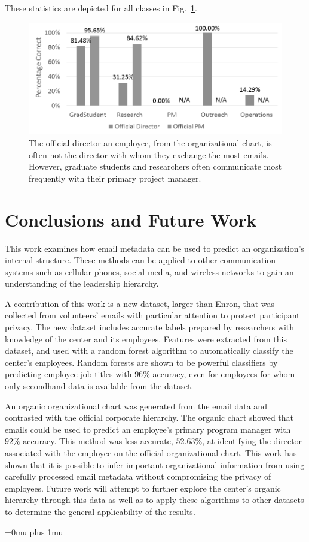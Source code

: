 \documentclass[10pt,twocolumn,conference]{IEEEtran}
\begin{document}
These statistics are depicted for all classes in Fig.~\ref{fig:project_analysis}.


\begin{figure}[t]
	\centering
	\includegraphics[width=\columnwidth,trim={1mm 5mm 10mm 2mm},clip]{superior_identification_BW}
	\caption{The official director an employee, from the organizational chart, is often not the director with whom they exchange the most emails.  However, graduate students and researchers often communicate most frequently with their primary project manager.}
	\label{fig:project_analysis}
\end{figure}

\section{Conclusions and Future Work} \label{Conclusions}
This work examines how email metadata can be used to predict an organization's internal structure.
These methods can be applied to other communication systems such as cellular phones, social media, and wireless networks to gain an understanding of the leadership hierarchy.

A contribution of this work is a new dataset, larger than Enron, that was collected from volunteers' emails with particular attention to protect participant privacy.
The new dataset includes accurate labels prepared by researchers with knowledge of the center and its employees.
Features were extracted from this dataset, and used with a random forest algorithm to automatically classify the center's employees.
Random forests are shown to be powerful classifiers by predicting employee job titles with $96\%$ accuracy, even for employees for whom only secondhand data is available from the dataset.

An organic organizational chart was generated from the email data and contrasted with the official corporate hierarchy.
The organic chart showed that emails could be used to predict an employee's primary program manager with $92\%$ accuracy.
This method was less accurate, $52.63\%$, at identifying the director associated with the employee on the official organizational chart.
This work has shown that it is possible to infer important organizational information from using carefully processed email metadata without compromising the privacy of employees.
Future work will attempt to further explore the center's organic hierarchy through this data as well as to apply these algorithms to other datasets to determine the general applicability of the results.

\Urlmuskip=0mu plus 1mu\relax


\end{document}
